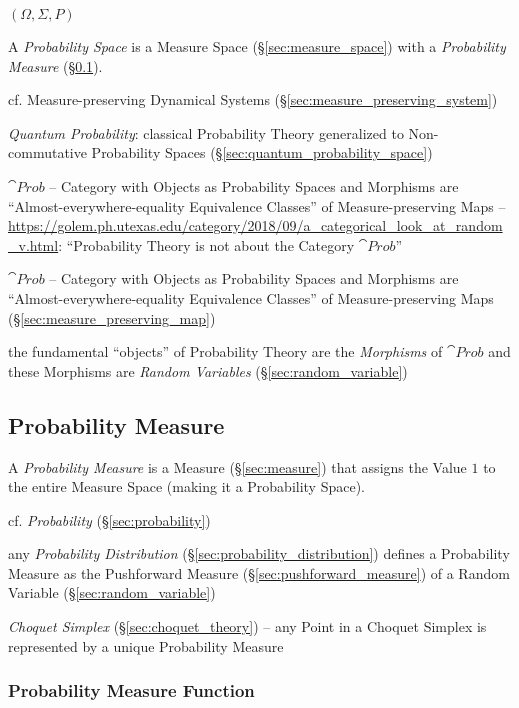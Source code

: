 $(\Omega, \Sigma, P)$

A \emph{Probability Space} is a Measure Space (\S\ref{sec:measure_space}) with a
\emph{Probability Measure} (\S\ref{sec:probability_measure}).

\fist cf. Measure-preserving Dynamical Systems
(\S\ref{sec:measure_preserving_system})

\fist \emph{Quantum Probability}: classical Probability Theory generalized to
Non-commutative Probability Spaces (\S\ref{sec:quantum_probability_space})

$\cat{Prob}$ -- Category with Objects as Probability Spaces and Morphisms are
``Almost-everywhere-equality Equivalence Classes'' of Measure-preserving Maps
--
\url{https://golem.ph.utexas.edu/category/2018/09/a_categorical_look_at_random_v.html}:
``Probability Theory is not about the Category $\cat{Prob}$''

$\cat{Prob}$ -- Category with Objects as Probability Spaces and Morphisms are
``Almost-everywhere-equality Equivalence Classes'' of Measure-preserving Maps
(\S\ref{sec:measure_preserving_map})

the fundamental ``objects'' of Probability Theory are the \emph{Morphisms} of
$\cat{Prob}$ and these Morphisms are \emph{Random Variables}
(\S\ref{sec:random_variable})



\subsection{Probability Measure}\label{sec:probability_measure}

A \emph{Probability Measure} is a Measure (\S\ref{sec:measure}) that assigns the
Value $1$ to the entire Measure Space (making it a Probability Space).

cf. \emph{Probability} (\S\ref{sec:probability})

\fist any \emph{Probability Distribution} (\S\ref{sec:probability_distribution})
defines a Probability Measure as the Pushforward Measure
(\S\ref{sec:pushforward_measure}) of a Random Variable
(\S\ref{sec:random_variable})

\emph{Choquet Simplex} (\S\ref{sec:choquet_theory}) -- any Point in a Choquet
Simplex is represented by a unique Probability Measure



\subsubsection{Probability Measure Function}
\label{sec:probability_measure_function}

